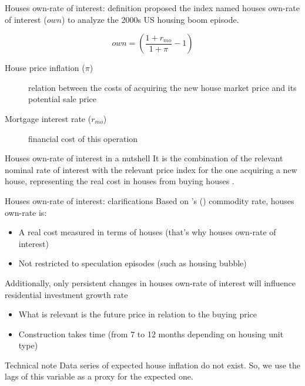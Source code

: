 \documentclass[10pt]{beamer}
\begin{document}
\begin{frame}[label={sec:orgdbf343b}]{Houses own-rate of interest: definition}
\textcite{teixeira_crescimento_2015}  proposed the index named houses own-rate of interest (\(own\)) to analyze the 2000s US housing boom episode.

\begin{latex}
\begin{equation}
\label{txpropria}
own =  \left(\frac{1+r_{mo}}{1+\pi} - 1\right)
\end{equation}
\end{latex}

\begin{description}
\item[{House price inflation (\(\pi\))}] relation between the costs of acquiring the new house market price and its potential sale price
\item[{Mortgage interest rate (\(r_{mo}\))}] financial cost of this operation
\end{description}

\begin{block}{Houses own-rate of interest in a nutshell}
It is the combination of the relevant nominal rate of interest with the relevant price index for the one acquiring a new house, representing the \alert{real cost in houses from buying houses} \parencite[p.~53]{teixeira_crescimento_2015}.
\end{block}
\end{frame}

\begin{frame}[label={sec:org0201f94}]{Houses own-rate of interest: clarifications}
\label{OwnClarification}
Based on \citeauthor*{sraffaDrHayekMoney1932}'s (\citeyear{sraffaDrHayekMoney1932}) commodity rate, houses own-rate is:

\begin{itemize}
\item A \alert{real cost} measured in terms of houses (that's why \alert{houses} own-rate of interest)
\item Not restricted to speculation episodes (such as housing bubble)
\end{itemize}

Additionally, only \alert{persistent} changes in houses own-rate of interest will influence residential investment growth rate
\begin{itemize}
\item What is relevant is the \alert{future} price in relation to the buying price
\item Construction takes time (from 7 to 12 months depending on housing unit type) \hyperlink{constructionPlot}{}
\end{itemize}

\begin{block}{Technical note}
Data series of expected house inflation do not exist.
So, we use the lags of this variable as a proxy for the expected one.
\end{block}
\end{frame}
\end{document}
